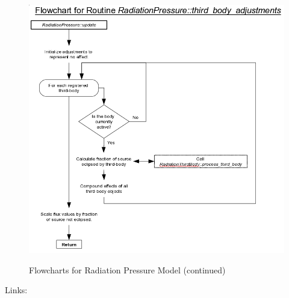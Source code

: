 \begin{figure}[!ht]
  \ \newline \ \newline
  \includegraphics[width = 6 in]{figs/flowchart/flow_third_body_adjustments.png}
  \caption{Flowcharts for Radiation Pressure Model (continued) }
  \label{fig:flow_third_body_adjustments}
\end{figure}

Links: \newline
{}\newline
{} \newline
\clearpage


